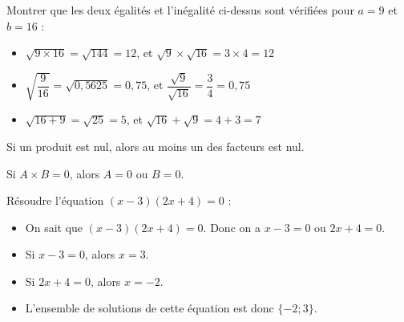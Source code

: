 \documentclass[
	classe=$2^{de}$
]{coursclass}
\begin{document}
\begin{greybox}
	Montrer que les deux égalités et l'inégalité ci-dessus sont vérifiées pour $a = 9$ et $b = 16$ :

	\begin{itemize}
		\item $\sqrt{9×16} = \sqrt{144} = 12$, et $\sqrt{9}×\sqrt{16}=3×4=12$
		\item $\sqrt{\dfrac{9}{16}} = \sqrt{0,5625} = 0,75$, et $\dfrac{\sqrt{9}}{\sqrt{16}} = \dfrac{3}{4} = 0,75$
		\item $\sqrt{16 + 9} = \sqrt{25} = 5$, et $\sqrt{16} + \sqrt{9}=4 + 3=7$
	\end{itemize}
\end{greybox}

\begin{propriete}
	Si un produit est nul, alors au moins un des facteurs est nul.

	\begin{center}
		Si $A × B = 0$, alors $A = 0$ ou $B = 0$.
	\end{center}
\end{propriete}

\begin{exemple}
	Résoudre l'équation $(x - 3)(2x + 4) = 0$ :

	\begin{itemize}
		\item On sait que $(x - 3)(2x + 4) = 0$. Donc on a $x - 3 = 0$ ou $2x + 4 = 0$.
		\item Si $x - 3 = 0$, alors $x = 3$.
		\item Si $2x + 4 = 0$, alors $x = -2$.
		\item L'ensemble de solutions de cette équation est donc $\{-2 ; 3\}$.
	\end{itemize}
\end{exemple}
\end{document}
